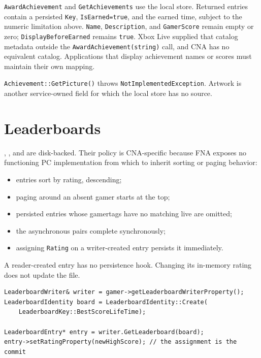 \texttt{AwardAchievement} and \texttt{GetAchievements} use the local store. Returned entries
contain a persisted \texttt{Key}, \texttt{IsEarned=true}, and the earned time, subject to the
numeric limitation above. \texttt{Name}, \texttt{Description}, and \texttt{GamerScore} remain
empty or zero; \texttt{DisplayBeforeEarned} remains \texttt{true}. Xbox Live supplied that
catalog metadata outside the \texttt{AwardAchievement(string)} call, and CNA has no equivalent
catalog. Applications that display achievement names or scores must maintain their own mapping.

\texttt{Achievement::GetPicture()} throws \texttt{NotImplementedException}. Artwork is another
service-owned field for which the local store has no source.

\section{Leaderboards}
\label{sec:leaderboards}

, , and
 are disk-backed. Their policy is CNA-specific because FNA exposes
no functioning PC implementation from which to inherit sorting or paging behavior:

\begin{itemize}
  \item entries sort by rating, descending;
  \item paging around an absent gamer starts at the top;
  \item persisted entries whose gamertags have no matching live  are omitted;
  \item the asynchronous pairs complete synchronously;
  \item assigning \texttt{Rating} on a writer-created entry persists it immediately.
\end{itemize}

A reader-created entry has no persistence hook. Changing its in-memory rating does not update
the file.

\begin{lstlisting}
LeaderboardWriter& writer = gamer->getLeaderboardWriterProperty();
LeaderboardIdentity board = LeaderboardIdentity::Create(
    LeaderboardKey::BestScoreLifeTime);

LeaderboardEntry* entry = writer.GetLeaderboard(board);
entry->setRatingProperty(newHighScore); // the assignment is the commit
\end{lstlisting}

